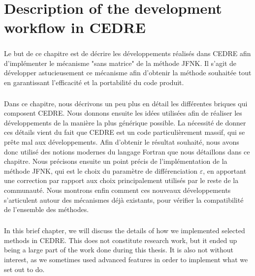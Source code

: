 \chapter{Description of the development workflow in CEDRE}

\begin{tcolorbox}[title=Résumé du chapitre : Description des développements dans CEDRE, colframe=black!50!white]
  \paragraph{}
  Le but de ce chapitre est de décrire les développements réalisés dans CEDRE afin d'implémenter le mécanisme "sans matrice" de la méthode JFNK.
  Il s'agit de développer astucieusement ce mécanisme afin d'obtenir la méthode souhaitée tout en garantissant l'efficacité et la portabilité du code produit.

  \paragraph{}
  Dans ce chapitre, nous décrivons un peu plus en détail les différentes briques qui composent CEDRE.
  Nous donnons ensuite les idées utilisées afin de réaliser les développements de la manière la plus générique possible.
  La nécessité de donner ces détails vient du fait que CEDRE est un code particulièrement massif, qui se prête mal aux développements.
  Afin d'obtenir le résultat souhaité, nous avons donc utilisé des notions modernes du langage Fortran que nous détaillons dans ce chapitre.
  Nous précisons ensuite un point précis de l'implémentation de la méthode JFNK, qui est le choix du paramètre de différenciation $\varepsilon$, en apportant une correction par rapport aux choix principalement utilisés par le reste de la communauté.
  Nous montrons enfin comment ces nouveaux développements s'articulent autour des mécanismes déjà existants, pour vérifier la compatibilité de l'ensemble des méthodes.
\end{tcolorbox}


  \vspace{1cm}
  \paragraph{}
  In this brief chapter, we will discuss the details of how we implemented selected methods in CEDRE.
  This does not constitute research work, but it ended up being a large part of the work done during this thesis.
  It is also not without interest, as we sometimes used advanced features in order to implement what we set out to do.


